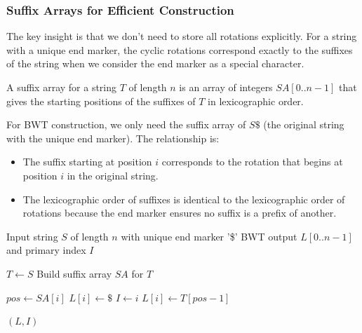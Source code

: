 \subsubsection{Suffix Arrays for Efficient Construction}

The key insight is that we don't need to store all rotations explicitly. For a string with a unique end marker, the cyclic rotations correspond exactly to the suffixes of the string when we consider the end marker as a special character.

\begin{definitionbox}
A suffix array for a string \(T\) of length \(n\) is an array of integers \(SA[0..n-1]\) that gives the starting positions of the suffixes of \(T\) in lexicographic order.
\end{definitionbox}

For BWT construction, we only need the suffix array of \(S\$\) (the original string with the unique end marker). The relationship is:

\begin{itemize}
    \item The suffix starting at position \(i\) corresponds to the rotation that begins at position \(i\) in the original string.
    \item The lexicographic order of suffixes is identical to the lexicographic order of rotations because the end marker ensures no suffix is a prefix of another.
\end{itemize}

\begin{algorithm}[H]
\caption{Efficient BWT Construction Using Suffix Arrays}
\begin{algorithmic}[1]
\Require Input string \(S\) of length \(n\) with unique end marker '\$'
\Ensure BWT output \(L[0..n-1]\) and primary index \(I\)

\State \(T \gets S\) 
\State Build suffix array \(SA\) for \(T\) 

    \State \(pos \gets SA[i]\)
        \State \(L[i] \gets \$\) 
        \State \(I \gets i\) 
    \Else
        \State \(L[i] \gets T[pos-1]\) 
    \EndIf
\EndFor

\State \Return \((L, I)\)
\end{algorithmic}
\end{algorithm}


